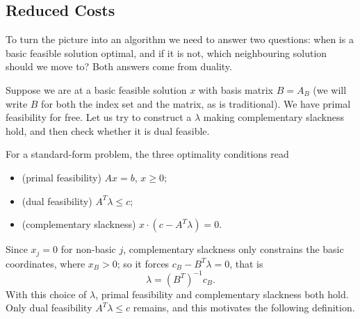 \documentclass[a4paper]{scrartcl}
\begin{document}
\begin{center}
\end{center}

\subsection{Reduced Costs}

To turn the picture into an algorithm we need to answer two questions: when is a basic feasible solution optimal, and if it is not, which neighbouring solution should we move to? Both answers come from duality.

Suppose we are at a basic feasible solution $x$ with basis matrix $B = A_B$ (we will write $B$ for both the index set and the matrix, as is traditional). We have primal feasibility for free. Let us try to construct a $\lambda$ making complementary slackness hold, and then check whether it is dual feasible.

For a standard-form problem, the three optimality conditions read
\begin{itemize}
    \item (primal feasibility) $Ax = b$, $x \geq 0$;
    \item (dual feasibility) $A^T\lambda \leq c$;
    \item (complementary slackness) $x\cdot(c - A^T\lambda) = 0$.
\end{itemize}
Since $x_j = 0$ for non-basic $j$, complementary slackness only constrains the basic coordinates, where $x_B > 0$; so it forces $c_B - B^T\lambda = 0$, that is
$$
\lambda = (B^T)^{-1}c_B.
$$
With this choice of $\lambda$, primal feasibility and complementary slackness both hold. Only dual feasibility $A^T\lambda \leq c$ remains, and this motivates the following definition.
\end{document}
